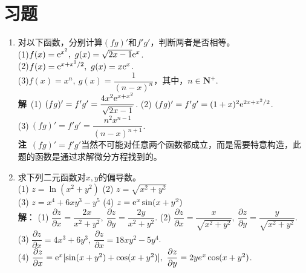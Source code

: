 
\section{习题} 
\begin{enumerate}[label={\textbf{\arabic*.}},leftmargin=
    \inteval{\myenumleftmargin}pt]
\item 对以下函数，分别计算$ (fg)' $和$ f'g' $，判断两者是否相等。\\
(1)$ f(x)=\e^{x^2},\ g(x)=\sqrt{2x-1}\e^x $.\\
(2)$ f(x)=\e^{x+x^2/2},\ g(x)=x\e^x $. \\
(3)$ f(x)=x^n,\ g(x)=\dfrac{1}{(n-x)^n} $，其中，$ n\in \textbf{N}^+ $.
\ifteach \\
\textbf{解}\ (1)$\ (fg)'=f'g'=\dfrac{4x^2\e^{x+x^2}}{\sqrt{2x-1}} $. \quad
(2)$\ (fg)'=f'g'=(1+x)^2\mathrm{e}^{2x+x^2/2} $. \\
(3)$\ (fg)'=f'g'=\dfrac{n^2x^{n-1}}{(n-x)^{n+1}} $. \\
\textbf{注}\ $ (fg)'=f'g' $当然不可能对任意两个函数都成立，而是需要特意构造，此题的函数是通过求解微分方程找到的。
\fi

\item 求下列二元函数对$ x,y $的偏导数。\\
(1) $ z=\ln(x^2+y^2) $ \quad (2) $ z=\sqrt{x^2+y^2} $ \\
(3) $ z=x^4+6xy^3-y^5 $ \quad (4) $ z=\mathrm{e}^x\sin(x+y^2)  $ 
\ifteach \\ \textbf{解}：
 (1) $ \dfrac{\partial z}{\partial x}=\dfrac{2x}{x^2+y^2},\ 
\dfrac{\partial z}{\partial y}=\dfrac{2y}{x^2+y^2} $. \quad
(2) $ \dfrac{\partial z}{\partial x}=\dfrac{x}{\sqrt{x^2+y^2}},\ 
\dfrac{\partial z}{\partial y}=\dfrac{y}{\sqrt{x^2+y^2}} $. \\
(3) $ \dfrac{\partial z}{\partial x}=4x^3+6y^3,\ 
\dfrac{\partial z}{\partial x}=18xy^2-5y^4 $. \\
(4) $ \dfrac{\partial z}{\partial x}=\e^x[\sin(x+y^2)+\cos(x+y^2)],\ 
\dfrac{\partial z}{\partial y}=2ye^x \cos(x+y^2) $. 
\fi


\end{enumerate}
